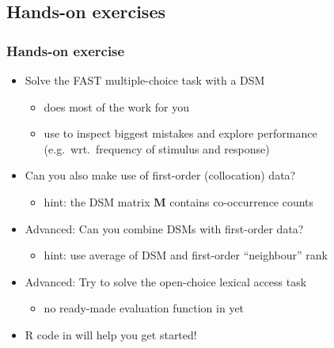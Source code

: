 \documentclass[t]{beamer} %
\begin{document}
\subsection{Hands-on exercises}

\begin{frame}
  \frametitle{Hands-on exercise}

  \ungap[1]
  \begin{itemize}
  \item Solve the FAST multiple-choice task with a DSM
    \begin{itemize}
    \item {} does most of the work for you
    \item use  to inspect biggest mistakes and explore performance (e.g.\ wrt.\ frequency of stimulus and response)
    \end{itemize}
    \gap
  \item Can you also make use of first-order (collocation) data?
    \begin{itemize}
    \item hint: the DSM matrix $\mathbf{M}$ contains co-occurrence counts
    \end{itemize}
    \gap
  \item Advanced: Can you combine DSMs with first-order data?
    \begin{itemize}
    \item hint: use average of DSM and first-order ``neighbour'' rank
    \end{itemize}
    \gap
  \item Advanced: Try to solve the open-choice lexical access task
    \begin{itemize}
    \item no ready-made evaluation function in  yet
    \end{itemize}
    \gap
  \item R code in  will help you get started!
  \end{itemize}
\end{frame}
\end{document}
